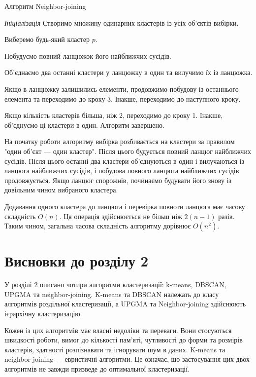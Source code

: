             \begin{algorithm}
                \caption {Алгоритм Neighbor-joining}
                \enumerate
                    \item [ ] \emph{Ініціалізація}
                        Створимо множину одинарних кластерів із усіх об’єктів вибірки.
                     \item
                        Виберемо будь-який кластер $p$.
                     \item
                        Побудуємо повний ланцюжок його найближчих сусідів.
                     \item
                        Об’єднаємо два останні кластери у ланцюжку в один та вилучимо їх із ланцюжка.
                     \item
                        Якщо в ланцюжку залишились елементи, продовжимо побудову із останнього елемента та переходимо до кроку 3. Інакше, переходимо до наступного кроку.
                     \item
                        Якщо кількість кластерів більша, ніж 2, переходимо до кроку 1. Інакше, об’єднуємо ці кластери в один. Алгоритм завершено.                      
            \end{algorithm}
            
            На початку роботи алгоритму вибірка розбивається на кластери за правилом "один об'єкт --- один кластер". Після цього будується повний ланцюг найближчих сусідів. Після цього останні два кластери об'єднуються в один і вилучаються із ланцюга найближчих сусідів, і побудова повного ланцюга найближчих сусідів продовжується. Якщо ланцюг спорожнів, починаємо будувати його знову із довільним чином вибраного кластера.
            
            Додавання одного кластера до ланцюга і перевірка повноти ланцюга має часову складність $O(n)$. Ця операція здійснюється не більш ніж $2(n-1)$ разів. Таким чином, загальна часова складність алгоритму дорівнює $O(n^2)$. 
            
    \section{Висновки до розділу 2}
        У розділі 2 описано чотири алгоритми кластеризації: k-means, DBSCAN, UPGMA та neighbor-joining. K-means та DBSCAN належать до класу алгоритмів роздільної кластеризації, а UPGMA та Neighbor-joining здійснюють ієрархічну кластеризацію. 
        
        Кожен із цих алгоритмів має власні недоліки та переваги. Вони стосуються швидкості роботи, вимог до кількості пам’яті, чутливості до форми та розмірів кластерів, здатності розпізнавати та ігнорувати шум в даних. K-means та neighbor-joining --- евристичні алгоритми. Це означає, що застосування цих двох алгоритмів не завжди призведе до оптимальної кластеризації.
